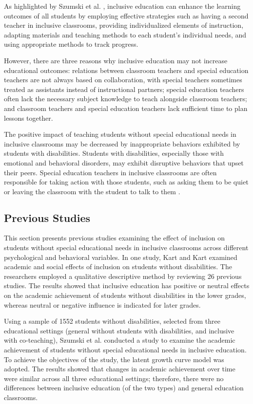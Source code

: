 \documentclass[10pt]{NSP1}
\begin{document}
	As highlighted by Szumski et al. \cite{ref24}, inclusive education can enhance the learning outcomes of all students by employing effective strategies such as having a second teacher in inclusive classrooms, providing individualized elements of instruction, adapting materials and teaching methods to each student's individual needs, and using appropriate methods to track progress.

	However, there are three reasons why inclusive education may not increase educational outcomes: relations between classroom teachers and special education teachers are not always based on collaboration, with special teachers sometimes treated as assistants instead of instructional partners; special education teachers often lack the necessary subject knowledge to teach alongside classroom teachers; and classroom teachers and special education teachers lack sufficient time to plan lessons together.

	The positive impact of teaching students without special educational needs in inclusive classrooms may be decreased by inappropriate behaviors exhibited by students with disabilities. Students with disabilities, especially those with emotional and behavioral disorders, may exhibit disruptive behaviors that upset their peers. Special education teachers in inclusive classrooms are often responsible for taking action with those students, such as asking them to be quiet or leaving the classroom with the student to talk to them \cite{ref25}.

	\subsection{Previous Studies}

	This section presents previous studies examining the effect of inclusion on students without special educational needs in inclusive classrooms across different psychological and behavioral variables. In one study, Kart and Kart \cite{ref26} examined academic and social effects of inclusion on students without disabilities. The researchers employed a qualitative descriptive method by reviewing 26 previous studies. The results showed that inclusive education has positive or neutral effects on the academic achievement of students without disabilities in the lower grades, whereas neutral or negative influence is indicated for later grades.

	Using a sample of 1552 students without disabilities, selected from three educational settings (general without students with disabilities, and inclusive with co-teaching), Szumski et al. \cite{ref24} conducted a study to examine the academic achievement of students without special educational needs in inclusive education. To achieve the objectives of the study, the latent growth curve model was adopted. The results showed that changes in academic achievement over time were similar across all three educational settings; therefore, there were no differences between inclusive education (of the two types) and general education classrooms.
\end{document}
